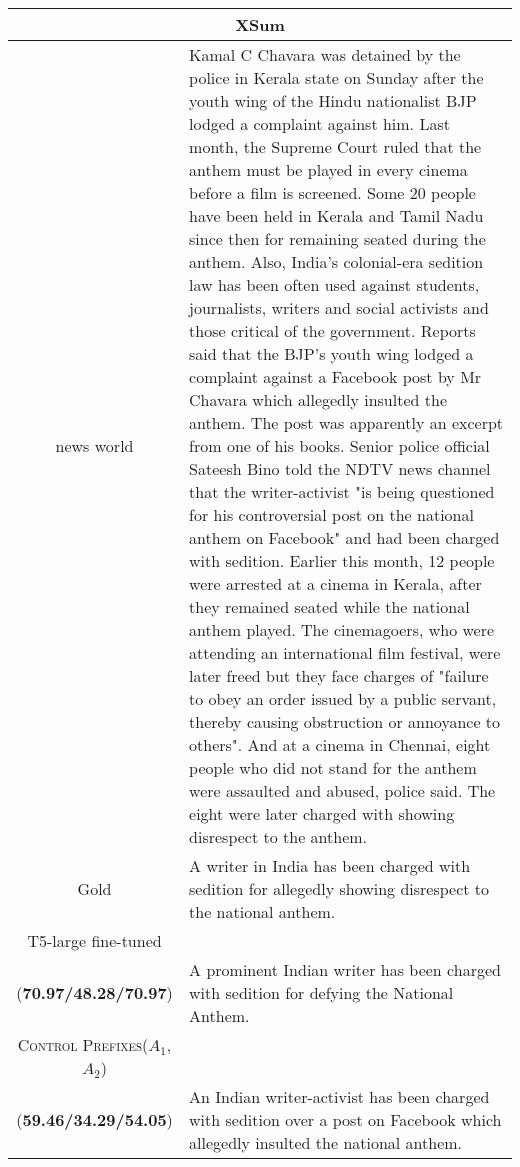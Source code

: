 \documentclass[11pt]{article}
\newcommand{\control}{\textsc{Control Prefixes}\xspace}
\newcommand{\bl}[1]{{\color{blue}  #1}}
\newcommand{\rd}[1]{{\color{red}  #1}}
\begin{document}
\begin{table*}[bth!]
\scriptsize
  \centering
  \renewcommand{\arraystretch}{1}
  \begin{tabular}{c|p{}}
  \hline
 
  \multicolumn{2}{c}{\textbf{XSum}} \\ \hline
  \bl{news} \rd{world} & Kamal C Chavara was detained by the police in Kerala state on Sunday after the youth wing of the Hindu nationalist BJP lodged a complaint against him.
Last month, the Supreme Court ruled that the anthem must be played in every cinema before a film is screened.
Some 20 people have been held in Kerala and Tamil Nadu since then for remaining seated during the anthem.
Also, India's colonial-era sedition law has been often used against students, journalists, writers and social activists and those critical of the government.
Reports said that the BJP's youth wing lodged a complaint against a Facebook post by Mr Chavara which allegedly insulted the anthem. The post was apparently an excerpt from one of his books.
Senior police official Sateesh Bino told the NDTV news channel that the writer-activist "is being questioned for his controversial post on the national anthem on Facebook" and had been charged with sedition.
Earlier this month, 12 people were arrested at a cinema in Kerala, after they remained seated while the national anthem played.
The cinemagoers, who were attending an international film festival, were later freed but they face charges of "failure to obey an order issued by a public servant, thereby causing obstruction or annoyance to others".
And at a cinema in Chennai, eight people who did not stand for the anthem were assaulted and abused, police said. The eight were later charged with showing disrespect to the anthem. \\ \hline
Gold & A writer in India has been charged with sedition for allegedly showing disrespect to the national anthem. \\ \hline
T5-large fine-tuned\\(\textbf{70.97/48.28/70.97})
  
& A prominent Indian writer has been charged with sedition for defying the National Anthem.  \\ \hline
\control ($A_{1}$,$A_{2}$)\\(\textbf{59.46/34.29/54.05})
& An Indian writer-activist has been charged with sedition over a post on Facebook which allegedly insulted the national anthem. \\ \midrule \hline


\end{tabular}
\end{table*}
\end{document}
